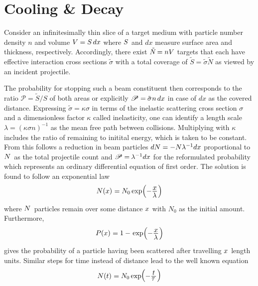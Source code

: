 \section{Cooling \& Decay}
\label{sec:cooling}

Consider an infinitesimally thin slice of a target medium with particle number density $n$ and volume $V \kern-0.1pt = S \kern+1.5pt dx$
where $S \kern+0.5pt$ and $dx$ measure surface area and thickness, respectively. Accordingly, there exist $\tilde{N} \kern-1.1pt = nV$
targets that each have effective interaction cross sections $\tilde{\sigma}$ with a total coverage of $\tilde{S} = \tilde{\sigma} \tilde{N}$
as viewed by an incident projectile.

The probability for stopping such a beam constituent then corresponds to the ratio $\mathscr{P} = \tilde{S} / S$ of both areas or
explicitly $\mathscr{P} = \kern-0.5pt \tilde{\sigma} \kern+0.5pt n \kern+1.5pt dx$ in case of $dx$ as the covered distance.
Expressing $\tilde{\sigma} = \kappa\sigma$ in terms of the inelastic scattering cross section $\sigma$ and a dimensionless factor
$\kappa$ called inelasticity, one can identify a length scale $\lambda = (\kappa\sigma n)^{-1}$ as the mean free path between
collisions. Multiplying with $\kappa$ includes the ratio of remaining to initital energy, which is taken to be constant. From this
follows a reduction in beam particles $dN \kern+0.1pt = - N \lambda^{-1} dx$ proportional to $N \kern+1.0pt$ as the total projectile
count and $\mathscr{P} = \kern-0.6pt \lambda^{-1} dx$ for the reformulated probability which represents an ordinary differential equation
of first order. The solution is found to follow an exponential law
\begin{equation*}
	N(x) \kern+0.4pt = N_0 \exp \Bigl( -\frac{\raisebox{-0.5ex}{$x$}}{\raisebox{0.5ex}{$\lambda \kern+0.3pt$}} \kern+0.5pt \Bigr)
\end{equation*}
where $N \kern+1.0pt$ particles remain over some distance $x \kern+0.5pt$ with $N_0$ as the initial amount. Furthermore,
\begin{equation*}
	P(x) \kern+0.3pt = 1 -
	\kern+0.9pt \exp \Bigl( -\frac{\raisebox{-0.5ex}{$x$}}{\raisebox{0.5ex}{$\lambda \kern+0.3pt$}}\kern+0.5pt \Bigr)
\end{equation*}
gives the probability of a particle having been scattered after travelling $x \kern+0.5pt$ length units. Similar steps
for time instead of distance lead to the well known equation
\begin{equation*}
	N(t) \kern+0.4pt = N_0 \exp \kern-2.0pt
	\raisebox{0.25ex}{\(\Bigl( \raisebox{-0.25ex}{\(-\frac{\raisebox{-0.5ex}{$t$}}{\raisebox{1.0ex}{$\tau \kern+1.0pt$}}\)}
	\kern+0.5pt \Bigr)\)}
\end{equation*}
